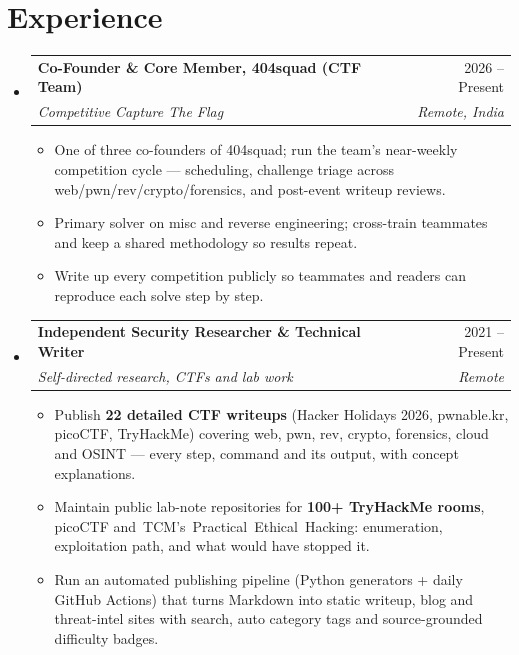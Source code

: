 \documentclass[letterpaper,11pt]{article}
\makeatletter
\newcommand{\resumeItem}[1]{
  \item\small{
    {#1\vspace{-2pt}}
  }
}
\newcommand{\resumeSubheading}[4]{
  \vspace{-2pt}\item
    \begin{tabular*}{\linewidth}[t]{l@{\extracolsep{\fill}}r}
      \textbf{#1} & #2 \\
      \textit{\small#3} & \textit{\small#4} \\
    \end{tabular*}\vspace{-7pt}
}
\newcommand{\resumeSubHeadingListStart}{\begin{itemize}[leftmargin=0.15in, label={}]}
\newcommand{\resumeSubHeadingListEnd}{\end{itemize}}
\newcommand{\resumeItemListStart}{\begin{itemize}}
\newcommand{\resumeItemListEnd}{\end{itemize}\vspace{-5pt}}
\makeatother
\begin{document}
\section{Experience}
  \resumeSubHeadingListStart

    \resumeSubheading
      {Co-Founder \& Core Member, 404squad (CTF Team)}{2026 -- Present}
      {Competitive Capture The Flag}{Remote, India}
      \resumeItemListStart
        \resumeItem{One of three co-founders of 404squad; run the team's near-weekly competition cycle --- scheduling, challenge triage across web/pwn/rev/crypto/forensics, and post-event writeup reviews.}
        \resumeItem{Primary solver on misc and reverse engineering; cross-train teammates and keep a shared methodology so results repeat.}
        \resumeItem{Write up every competition publicly so teammates and readers can reproduce each solve step by step.}
      \resumeItemListEnd

    \resumeSubheading
      {Independent Security Researcher \& Technical Writer}{2021 -- Present}
      {Self-directed research, CTFs and lab work}{Remote}
      \resumeItemListStart
        \resumeItem{Publish \textbf{22 detailed CTF writeups} (Hacker Holidays 2026, pwnable.kr, picoCTF, TryHackMe) covering web, pwn, rev, crypto, forensics, cloud and OSINT --- every step, command and its output, with concept explanations.}
        \resumeItem{Maintain public lab-note repositories for \textbf{100+ TryHackMe rooms}, picoCTF \mbox{and TCM's Practical Ethical Hacking}: enumeration, exploitation path, and what would have stopped it.}
        \resumeItem{Run an automated publishing pipeline (Python generators + daily GitHub Actions) that turns Markdown into static writeup, blog and threat-intel sites with search, auto category tags and source-grounded difficulty badges.}
      \resumeItemListEnd

  \resumeSubHeadingListEnd


\end{document}
